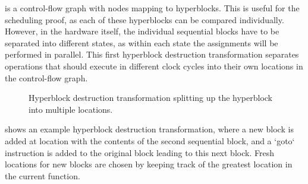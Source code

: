 \rtlpar{} is a control-flow graph with nodes mapping to hyperblocks.  This is
useful for the scheduling proof, as each of these hyperblocks can be compared
individually.  However, in the hardware itself, the individual sequential blocks
have to be separated into different states, as within each state the
assignments will be performed in parallel.  This first hyperblock destruction
transformation separates operations that should execute in different clock
cycles into their own locations in the control-flow graph.

\begin{figure}
  \centering
  \caption{Hyperblock destruction transformation splitting up the hyperblock into
    multiple locations.}%
  \label{fig:hg:hyperblock-destruction}
\end{figure}

 shows an example hyperblock destruction
transformation, where a new block is added at location  with the
contents of the second sequential block, and a \rtlinline`goto` instruction is
added to the original block leading to this next block.  Fresh locations for new
blocks are chosen by keeping track of the greatest location in the current
function.

